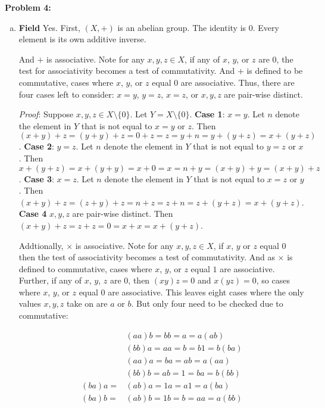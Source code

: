 \documentclass[12pt, letterpaper]{article}
\newenvironment{problem}
    [1]
    {\noindent \textbf{Problem #1:}}
    {\vspace{3mm}}
\begin{document}
\begin{problem}{4}
\begin{enumerate}[(a)]
        \item  \textbf{Field} Yes. First, $(X, +)$ is an abelian group. The identity is $0$. Every element is 
        its own additive inverse.

        \bigskip\noindent
        And $+$ is associative. Note for any $x, y, z \in X$, if any of $x$, $y$, or $z$ are $0$, the
        test for associativity becomes a test of commutativity. And $+$ is defined to be commutative, cases where
        $x$, $y$, or $z$ equal $0$ are associative. Thus, there are four cases left to consider: $x = y$, $y = z$, 
        $x = z$, or $x, y, z$ are pair-wise distinct.
        
        \bigskip\noindent
        \emph{Proof}: Suppose $x, y, z \in X \setminus \{0\}$. Let $Y = X \setminus \{0\}$. \textbf{Case 1}: $x = y$. 
        Let $n$ denote the element in $Y$ that is not equal to $x = y$ or $z$. Then $(x + y) + z = (y + y) + z = 0 + z 
        = z = y + n = y + (y + z) = x + (y + z)$. \textbf{Case 2}: $y = z$. Let $n$ denote the element in $Y$ that is not
        equal to $y = z$ or $x$. Then $x + (y + z) = x + (y + y) = x + 0 = x = n + y = (x + y) + y = (x + y) + z$. 
        \textbf{Case 3}: $x = z$. Let $n$ denote the element in $Y$ that is not equal to $x = z$ or $y$. Then $(x + y) + 
        z = (z + y) + z = n + z = z + n = z + (y + z) = x + (y + z)$. \textbf{Case 4} $x, y, z$ are pair-wise distinct. 
        Then $(x + y) + z = z + z = 0 = x + x = x + (y + z)$.

        \bigskip\noindent
        Addtionally, $\times$ is associative. Note for any $x, y, z \in X$, if $x$, $y$ or $z$ equal $0$ then the test of
        associativity becomes a test of commutativity. And as $\times$ is defined to commutative, cases where $x$, $y$, or $z$ 
        equal $1$ are associative. Further, if any of $x$, $y$, $z$ are $0$, then $(xy)z = 0$ and $x(yz) = 0$, so cases where
        $x$, $y$, or $z$ equal $0$ are associative. This leaves eight cases where the only values $x, y, z$ take on are $a$ or $b$.
        But only four need to be checked due to commutative:

        \begin{align*}
            &(aa)b = bb = a = a(ab)\\
            &(bb)a = aa = b = b1 = b(ba)\\
            &(aa)a = ba = ab = a(aa)\\
            &(bb)b = ab = 1 = ba = b(bb)\\
            (ba)a = &(ab)a = 1a = a1 = a(ba)\\
            (ba)b = &(ab)b = 1b = b = aa = a(bb)
        \end{align*}


\end{enumerate}
\end{problem}
\end{document}
